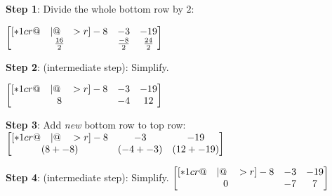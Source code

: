 \documentclass[12pt,tiks]{article}
\begin{document}
    \hspace{.1in}\vspace{.5in}
    
    \begin{minipage}[t][.5in][t]{2.4in}\RaggedRight
    \textbf{Step 1}: Divide the whole bottom row by $2$:
    
    \par\vspace{.05in}
    
        $
            \begin{bmatrix}[*1cr@{\quad}|@{\quad}>{\color{black}}r]
              -8 & -3 & -19 \\
              \frac{16}{2} & \frac{-8}{2} & \frac{24}{2}
            \end{bmatrix}
        $
    \end{minipage}
    \hspace{.1in}
    \begin{minipage}[t][.7in][t]{3in}\RaggedRight
    \-\vspace*{.1in}
    \textbf{Step 2}: (intermediate step): Simplify.
    
    \par\vspace{.05in}
    
        $
            \begin{bmatrix}[*1cr@{\quad}|@{\quad}>{\color{black}}r]
              -8 & -3 & -19 \\
              8 & -4 & 12
            \end{bmatrix}
        $
    \end{minipage}
    
    \hspace{.1in}\vspace{.5in}
    
    \begin{minipage}[t][.7in][t]{3in}\RaggedRight
    \-\vspace*{.1in}
    \textbf{Step 3}: Add \textit{new} bottom row to top row:
        $
            \begin{bmatrix}[*1cr@{\quad}|@{\quad}>{\color{black}}r]
              -8 & -3 & -19 \\
              ({8+{-8}}) & ({-4+{-3}}) & ({12+{-19}})
            \end{bmatrix}
        $
    \end{minipage}
    \hspace{.1in}
    \begin{minipage}[t][.7in][t]{3in}\RaggedRight
    \-\vspace*{.1in}
    \textbf{Step 4}: (intermediate step): Simplify.
        $
            \begin{bmatrix}[*1cr@{\quad}|@{\quad}>{\color{black}}r]
              -8 & -3 & -19 \\
              0 & -7 & 7
            \end{bmatrix}
        $
    \end{minipage}
    
\end{document}
